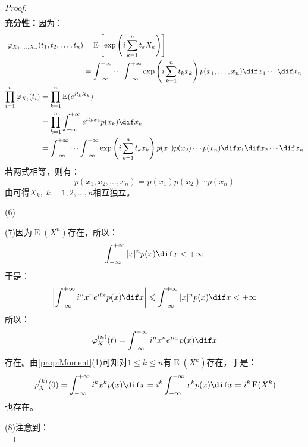 \begin{proof}
\begin{align*}
	\end{align*}
	\textbf{充分性：}因为：
	\begin{gather*}
		\begin{aligned}
			\varphi_{X_1,\dots,X_n}(t_1,t_2,\dots,t_n)
			&=\operatorname{E}\left[\exp\left(i\sum_{k=1}^{n}t_kX_k\right)\right] \\
			&=\int_{-\infty}^{+\infty}\cdots\int_{-\infty}^{+\infty}\exp\left(i\sum_{k=1}^{n}t_kx_k\right)p(x_1,\dots,x_n)\dif x_1\cdots\dif x_n
		\end{aligned} \\
		\begin{aligned}
			\prod_{i=1}^n\varphi_{X_i}(t_i)
			&=\prod_{k=1}^n\operatorname{E}(e^{it_kX_k}) \\
			&=\prod_{k=1}^n\int_{-\infty}^{+\infty}e^{it_kx_k}p(x_k)\dif x_k \\
			&=\int_{-\infty}^{+\infty}\cdots\int_{-\infty}^{+\infty}\exp\left(i\sum_{k=1}^{n}t_kx_k\right)p(x_1)p(x_2)\cdots p(x_n)\dif x_1\dif x_2\cdots\dif x_n
		\end{aligned}
	\end{gather*}
	若两式相等，则有：
	\begin{equation*}
		p(x_1,x_2,\dots,x_n)=p(x_1)p(x_2)\cdots p(x_n)
	\end{equation*}
	由可得$X_k,\;k=1,2,\dots,n$相互独立。\par
	(6)\par
	(7)因为$\operatorname{E}(X^n)$存在，所以：
	\begin{equation*}
		\int_{-\infty}^{+\infty}|x|^np(x)\dif x<+\infty
	\end{equation*}
	于是：
	\begin{equation*}
		\left|\int_{-\infty}^{+\infty}i^nx^ne^{itx}p(x)\dif x\right|\leqslant\int_{-\infty}^{+\infty}|x|^np(x)\dif x<+\infty
	\end{equation*}
	所以：
	\begin{equation*}
		\varphi_X^{(n)}(t)=\int_{-\infty}^{+\infty}i^nx^ne^{itx}p(x)\dif x
	\end{equation*}
	存在。由\cref{prop:Moment}(1)可知对$1\leqslant k\leqslant n$有$\operatorname{E}(X^k)$存在，于是：
	\begin{equation*}
		\varphi_X^{(k)}(0)=\int_{-\infty}^{+\infty}i^kx^kp(x)\dif x=i^k\int_{-\infty}^{+\infty}x^kp(x)\dif x=i^k\operatorname{E}(X^k)
	\end{equation*}
	也存在。\par
	(8)注意到：
	\begin{equation*}

\end{equation*}
\end{proof}
